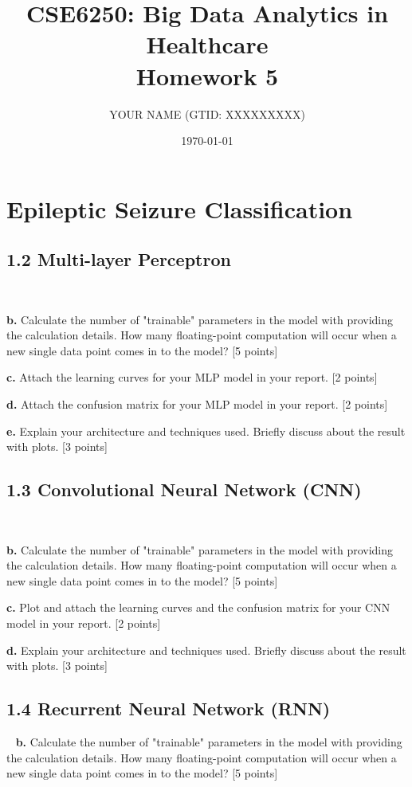 \documentclass[12pt]{article}
\title{CSE6250: Big Data Analytics in Healthcare \\ Homework 5}
\author{YOUR NAME (GTID: XXXXXXXXX)}
\date{\today}
\begin{document}
\maketitle

\section{Epileptic Seizure Classification}

\subsection*{1.2 Multi-layer Perceptron}
~

\textbf{b.} Calculate the number of "trainable" parameters in the model with providing the calculation details. How many floating-point computation will occur when a new single data point comes in to the model? [5 points]

\bigskip

\textbf{c.} Attach the learning curves for your MLP model in your report. [2 points]

\bigskip

\textbf{d.} Attach the confusion matrix for your MLP model in your report. [2 points]

\bigskip
\textbf{e.} Explain your architecture and techniques used. Briefly discuss about the result with plots. [3 points]

\subsection*{1.3 Convolutional Neural Network (CNN)}
~

\textbf{b.} Calculate the number of "trainable" parameters in the model with providing the calculation details. How many floating-point computation will occur when a new single data point comes in to the model? [5 points]

\bigskip

\textbf{c.} Plot and attach the learning curves and the confusion matrix for your CNN model in your report. [2 points]

\bigskip
\textbf{d.} Explain your architecture and techniques used. Briefly discuss about the result with plots. [3 points]

\subsection*{1.4 Recurrent Neural Network (RNN)}
~
\textbf{b.} Calculate the number of "trainable" parameters in the model with providing the calculation details. How many floating-point computation will occur when a new single data point comes in to the model? [5 points]
\end{document}
